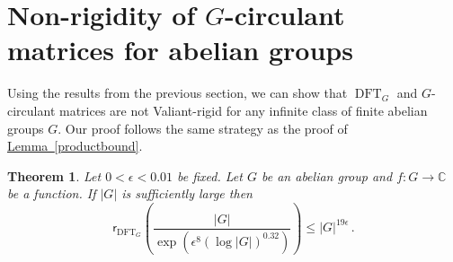 \documentclass[11pt]{article}
\numberwithin{equation}{section}
\newtheorem{theorem}{Theorem}[section]
\theoremstyle{definition}
\theoremstyle{plain}
\newcommand{\C}{\mathbb C}
\newcommand{\expref}[2]{\hyperref[#2]{#1~\ref{#2}}}
\theoremstyle{definition}
\renewcommand\C{{\mathbb{C}}}
\DeclareMathOperator{\DFT}{DFT}
\begin{document}
%


%
\section{Non-rigidity of
 \texorpdfstring{$G$}{G}-circulant matrices for abelian groups}\label{sec_groupalgebra}
Using the results from the previous section, we can show that %
$\DFT_G$ and %
$G$-circulant matrices are not Valiant-rigid for any
%
infinite class of finite abelian groups $G$.  %
Our proof follows the same strategy as
the proof of \expref{Lemma}{productbound}.

%

\begin{theorem}\label{DFTabelian}
Let $0 < \epsilon < 0.01$ be fixed.  Let $G$ be an abelian group and $f: G \rightarrow \C$ be a function.  If $|G|$ is sufficiently large then
\[
\textsf{r}_{\DFT_G}\left(\frac{|G|}{\exp\left(\epsilon^8 (\log |G|)^{0.32}\right)}\right) \leq  |G|^{19 \epsilon} \,.
\]
\end{theorem}
\end{document}
